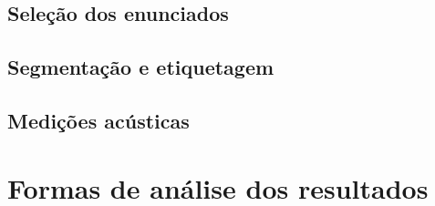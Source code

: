 \documentclass[
    a4paper,	%
    12pt,	%
    ]{article}	%
\begin{document}
	\subsection{Seleção dos enunciados} 
	\label{selecao}

	\subsection{Segmentação e etiquetagem} 
	\label{segm}

	\subsection{Medições acústicas} 
	\label{medicoes}
	
\section{Formas de análise dos resultados} 
\label{analise}

{ %
	\printbibliography
}
\end{document}

